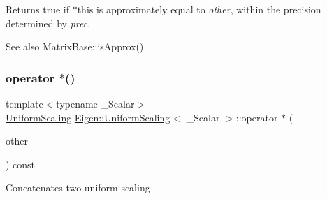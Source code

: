 \begin{DoxyReturn}{Returns}
{\ttfamily true} if {\ttfamily $\ast$this} is approximately equal to {\itshape other}, within the precision determined by {\itshape prec}.
\end{DoxyReturn}
\begin{DoxySeeAlso}{See also}
Matrix\+Base\+::is\+Approx() 
\end{DoxySeeAlso}
\mbox{\label{class_eigen_1_1_uniform_scaling_ab847241b81e843c18f3ad2005b920c26}} 
\subsubsection{\texorpdfstring{operator $\ast$()}{operator *()}\hspace{0.1cm}{\footnotesize\ttfamily [1/4]}}
{\footnotesize\ttfamily template$<$typename \+\_\+\+Scalar$>$ \\
\mbox{\hyperlink{class_eigen_1_1_uniform_scaling}{Uniform\+Scaling}} \mbox{\hyperlink{class_eigen_1_1_uniform_scaling}{Eigen\+::\+Uniform\+Scaling}}$<$ \+\_\+\+Scalar $>$\+::operator $\ast$ (\begin{DoxyParamCaption}\item[{const \mbox{\hyperlink{class_eigen_1_1_uniform_scaling}{Uniform\+Scaling}}$<$ \+\_\+\+Scalar $>$ \&}]{other }\end{DoxyParamCaption}) const\hspace{0.3cm}{\ttfamily [inline]}}

Concatenates two uniform scaling \mbox{\label{class_eigen_1_1_uniform_scaling_a5af613323ea7b64f6cdd79b146471441}} 
